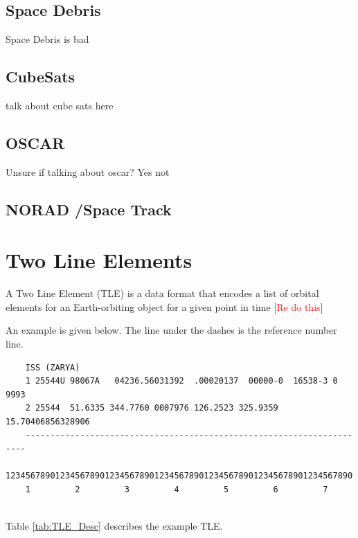 \documentclass[12pt]{report}
\begin{document}
	\subsection{Space Debris}
	Space Debris is bad
	\subsection{CubeSats}
	talk about cube sats here
	
	\subsection{OSCAR}
	Unsure if talking about oscar? Yes not
	\subsection{NORAD /Space Track}
	
	\newpage
	\section{Two Line Elements}
	A Two Line Element (TLE) is a data format that encodes a list of orbital elements for an Earth-orbiting object for a given point in time [\textcolor{red}{Re do this}]\par
	An example is given below. The line under the dashes is the reference number line.
	\begin{verbatim}
	ISS (ZARYA)
	1 25544U 98067A   04236.56031392  .00020137  00000-0  16538-3 0  9993
	2 25544  51.6335 344.7760 0007976 126.2523 325.9359 15.70406856328906
	----------------------------------------------------------------------
	1234567890123456789012345678901234567890123456789012345678901234567890   
	1         2         3         4         5         6         7
	
	\end{verbatim}
	Table \ref{tab:TLE_Desc}\cite{SpaceTrackTLE} describes the example TLE. 
	
\end{document}
